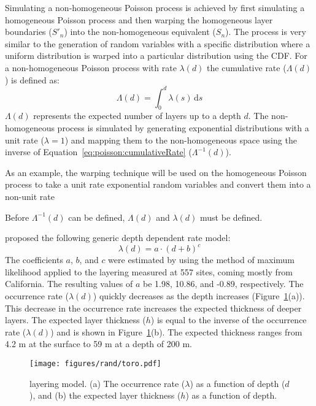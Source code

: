 \documentclass[12pt,oneside]{book}
\newcommand{\ud}{\,\mathrm{d}}
\begin{document}
Simulating a non-homogeneous Poisson process is achieved by first simulating a homogeneous Poisson
process and then warping the homogeneous layer boundaries ($S'_n$) into the non-homogeneous
equivalent ($S_n$).  The process is very similar to the generation of random variables with a
specific distribution where a uniform distribution is warped into a particular distribution using
the CDF.  For a non-homogeneous Poisson process with rate $\lambda(d)$ the cumulative rate
($\Lambda(d)$) is defined as:
\begin{equation}
    \Lambda(d) = \int_{0}^{d} \lambda(s) \ud s
    \label{eq:poisson:cumulativeRate}
\end{equation}
$\Lambda(d)$ represents the expected number of layers up to a depth $d$.  The non-homogeneous
process is simulated by generating exponential distributions with a unit rate ($\lambda=1$) and
mapping them to the non-homogeneous space using the inverse of
Equation~\ref{eq:poisson:cumulativeRate} ($\Lambda^{-1}(d)$).  

As an example, the warping technique
will be used on the homogeneous Poisson process to take a unit rate exponential random variables and
convert them into a non-unit rate





Before $\Lambda^{-1}(d)$ can be
defined, $\Lambda(d)$ and $\lambda(d)$ must be defined.

\citet{toro:95} proposed the following generic depth dependent rate model:
\begin{equation}
    \lambda(d)= a \cdot (d + b)^{c}
    \label{eq:toro:rate:generic}
\end{equation}
The coefficients $a$, $b$, and $c$ were estimated by \citet{toro:95} using the method of maximum
likelihood applied to the layering measured at 557 sites, coming mostly from California.  The
resulting values of $a$ be 1.98, 10.86, and -0.89, respectively.  The occurrence rate ($\lambda(d)$) quickly
decreases as the depth increases (Figure~\ref{fig:rand:toro}(a)).  This decrease in the
occurrence rate increases the expected thickness of deeper layers.  The expected layer thickness
($h$) is equal to the inverse of the occurrence rate ($\lambda(d)$) and is shown in
Figure~\ref{fig:rand:toro}(b).  The expected thickness ranges from 4.2 m at the surface to
59 m at a depth of 200 m.

\begin{figure}[htb]
    \begin{center}
        \texttt{[image: figures/rand/toro.pdf]}
    \end{center}
    \caption{\citet{toro:95} layering model. (a) The occurrence rate ($\lambda$) as a function of depth
    ($d$), and (b) the expected layer thickness ($h$) as a function of depth.}
    \label{fig:rand:toro}
\end{figure}
\end{document}

